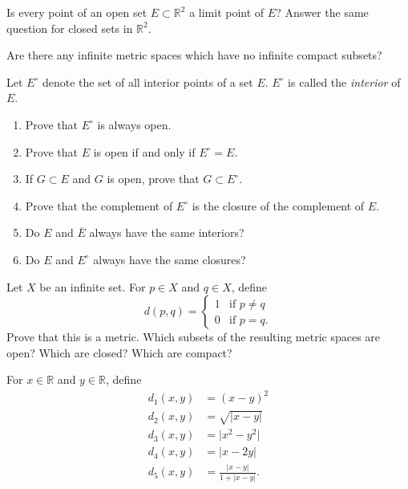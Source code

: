 \documentclass[12 pt, letterpaper]{hmcpset}
\begin{document}
\pagebreak

\begin{problem}[8.]
	Is every point of an open set $E \subset \mathbb{R}^{2}$ a limit point of $E$? Answer the same question for closed sets in $\mathbb{R}^{2}$.
\end{problem}

\pagebreak

\begin{problem}[8*.]
	Are there any infinite metric spaces which have no infinite compact subsets?
\end{problem}

\pagebreak

\begin{problem}[9.]
	Let $E^{\circ}$ denote the set of all interior points of a set $E$. $E^{\circ}$ is called the \textit{interior} of $E$.
	\begin{enumerate}
		\item Prove that $E^{\circ}$ is always open.
		\item Prove that $E$ is open if and only if $E^{\circ} = E$.
		\item If $G \subset E$ and $G$ is open, prove that $G \subset E^{\circ}$.
		\item Prove that the complement of $E^{\circ}$ is the closure of the complement of $E$.
		\item Do $E$ and $\overline{E}$ always have the same interiors?
		\item Do $E$ and $E^{\circ}$ always have the same closures?
	\end{enumerate}
\end{problem}

\pagebreak

\begin{problem}[10.]
	Let $X$ be an infinite set. For $p \in X$ and $q \in X$, define
	\[
		d(p, q) = \begin{cases}
			1 & \text{if } p \neq q \\
			0 & \text{if } p = q.
		\end{cases}
	\]
	Prove that this is a metric. Which subsets of the resulting metric spaces are open? Which are closed? Which are compact?
\end{problem}

\pagebreak

\begin{problem}[11.]
	For $x \in \mathbb{R}$ and $y \in \mathbb{R}$, define
	\[
		\begin{split}
			d_{1}(x, y) & = (x - y)^{2} \\
			d_{2}(x, y) & = \sqrt{\lvert x - y \rvert} \\
			d_{3}(x, y) & = \lvert x^{2} - y^{2} \rvert \\
			d_{4}(x, y) & = \lvert x - 2y \rvert \\
			d_{5}(x, y) & = \frac{\lvert x - y \rvert}{1 + \lvert x - y \rvert}.
		\end{split}
	\]
\end{problem}
\end{document}
